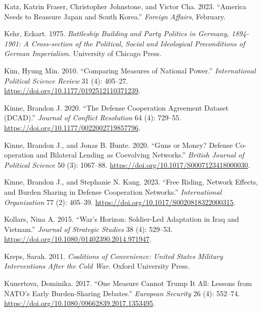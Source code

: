\documentclass[
  12,
  letterpaper,
  DIV=11,
  numbers=noendperiod]{scrartcl}
\newlength{\cslhangindent}
\newlength{\cslentryspacingunit} %
\newenvironment{CSLReferences}[2] %
 {%
  \setlength{\parindent}{0pt}
  \ifodd #1
  \let\oldpar\par
  \def\par{\hangindent=\cslhangindent\oldpar}
  \fi
  \setlength{\parskip}{#2\cslentryspacingunit}
 }%
 {}
\begin{document}
\begin{CSLReferences}{1}{0}
\leavevmode{}%
Katz, Katrin Fraser, Christopher Johnstone, and Victor Cha. 2023.
{``America {Needs} to {Reassure Japan} and {South Korea}.''}
\emph{Foreign Affairs}, February.

\leavevmode{}%
Kehr, Eckart. 1975. \emph{Battleship {Building} and {Party Politics} in
{Germany}, 1894-1901: {A Cross-section} of the {Political}, {Social} and
{Ideological Preconditions} of {German Imperialism}}. {University of
Chicago Press}.

\leavevmode{}%
Kim, Hyung Min. 2010. {``Comparing {Measures} of {National Power}.''}
\emph{International Political Science Review} 31 (4): 405--27.
\url{https://doi.org/10.1177/0192512110371239}.

\leavevmode{}%
Kinne, Brandon J. 2020. {``The {Defense Cooperation Agreement Dataset}
({DCAD}).''} \emph{Journal of Conflict Resolution} 64 (4): 729--55.
\url{https://doi.org/10.1177/0022002719857796}.

\leavevmode{}%
Kinne, Brandon J., and Jonas B. Bunte. 2020. {``Guns or {Money}?
{Defense Co-operation} and {Bilateral Lending} as {Coevolving
Networks}.''} \emph{British Journal of Political Science} 50 (3):
1067--88. \url{https://doi.org/10.1017/S0007123418000030}.

\leavevmode{}%
Kinne, Brandon J., and Stephanie N. Kang. 2023. {``Free {Riding},
{Network Effects}, and {Burden Sharing} in {Defense Cooperation
Networks}.''} \emph{International Organization} 77 (2): 405--39.
\url{https://doi.org/10.1017/S0020818322000315}.

\leavevmode{}%
Kollars, Nina A. 2015. {``War's {Horizon}: {Soldier-Led Adaptation} in
{Iraq} and {Vietnam}.''} \emph{Journal of Strategic Studies} 38 (4):
529--53. \url{https://doi.org/10.1080/01402390.2014.971947}.

\leavevmode{}%
Kreps, Sarah. 2011. \emph{Coalitions of {Convenience}: {United States
Military Interventions} After the {Cold War}}. {Oxford University
Press}.

\leavevmode{}%
Kunertova, Dominika. 2017. {``One Measure Cannot Trump It All: Lessons
from {NATO}'s Early Burden-Sharing Debates.''} \emph{European Security}
26 (4): 552--74. \url{https://doi.org/10.1080/09662839.2017.1353495}.


\end{CSLReferences}
\end{document}
